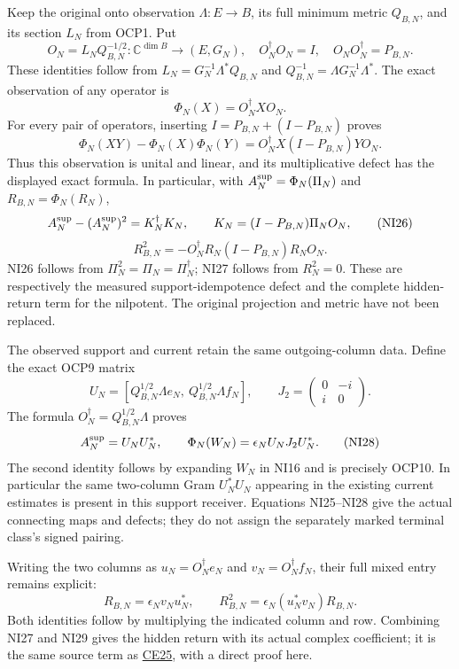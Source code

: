 \documentclass[
]{article}
\begin{document}
Keep the original onto observation \(\Lambda:E\to B\), its full minimum
metric \(Q_{B,N}\), and its section \(L_N\) from OCP1. Put \[
O_N=L_NQ_{B,N}^{-1/2}:\mathbb C^{\dim B}\longrightarrow(E,G_N),
\quad O_N^\dagger O_N=I,\quad O_NO_N^\dagger=P_{B,N}.
\] These identities follow from \(L_N=G_N^{-1}\Lambda^*Q_{B,N}\) and
\(Q_{B,N}^{-1}=\Lambda G_N^{-1}\Lambda^*\). The exact observation of any
operator is \[
\Phi_N(X)=O_N^\dagger X O_N.
\] For every pair of operators, inserting \(I=P_{B,N}+(I-P_{B,N})\)
proves \[
\Phi_N(XY)-\Phi_N(X)\Phi_N(Y)
=O_N^\dagger X(I-P_{B,N})Y O_N.
\tag{NI25}
\] Thus this observation is unital and linear, and its multiplicative
defect has the displayed exact formula. In particular, with
\(A_N^{\rm sup}=\Phi_N(\Pi_N)\) and \(R_{B,N}=\Phi_N(R_N)\), \[
A_N^{\rm sup}-(A_N^{\rm sup})^2
=K_N^\dagger K_N,\qquad
K_N=(I-P_{B,N})\Pi_NO_N,
\tag{NI26}
\] \[
R_{B,N}^2=-O_N^\dagger R_N(I-P_{B,N})R_NO_N.
\tag{NI27}
\] NI26 follows from \(\Pi_N^2=\Pi_N=\Pi_N^\dagger\); NI27 follows from
\(R_N^2=0\). These are respectively the measured support-idempotence
defect and the complete hidden-return term for the nilpotent. The
original projection and metric have not been replaced.

The observed support and current retain the same outgoing-column data.
Define the exact OCP9 matrix \[
U_N=[Q_{B,N}^{1/2}\Lambda e_N,\ Q_{B,N}^{1/2}\Lambda f_N],
\qquad J_2=\begin{pmatrix}0&-i\\i&0\end{pmatrix}.
\] The formula \(O_N^\dagger=Q_{B,N}^{1/2}\Lambda\) proves \[
A_N^{\rm sup}=U_NU_N^*,\qquad
\Phi_N(W_N)=\epsilon_NU_NJ_2U_N^*.
\tag{NI28}
\] The second identity follows by expanding \(W_N\) in NI16 and is
precisely OCP10. In particular the same two-column Gram \(U_N^*U_N\)
appearing in the existing current estimates is present in this support
receiver. Equations NI25--NI28 give the actual connecting maps and
defects; they do not assign the separately marked terminal class's
signed pairing.

Writing the two columns as \(u_N=O_N^\dagger e_N\) and
\(v_N=O_N^\dagger f_N\), their full mixed entry remains explicit: \[
R_{B,N}=\epsilon_Nv_Nu_N^*,\qquad
R_{B,N}^2=\epsilon_N(u_N^*v_N)R_{B,N}.
\tag{NI29}
\] Both identities follow by multiplying the indicated column and row.
Combining NI27 and NI29 gives the hidden return with its actual complex
coefficient; it is the same source term as
\href{https://github.com/KokunoYumeto/zeta-function-research-reader/blob/5c69161ca70ee187f41df0bfe786e8b6eebed422/workbenches/splitzero-tandem/continuations/20260922-current-effective-cutoff/EVOLUTION_PROOF.md\#L255}{CE25},
with a direct proof here.
\end{document}
